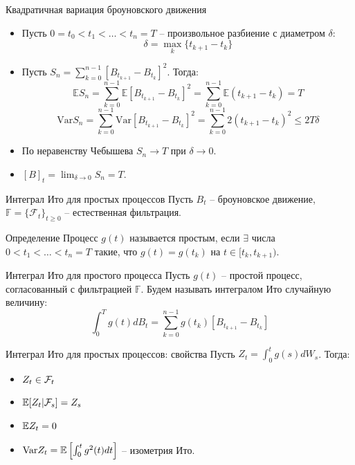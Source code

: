 \documentclass{beamer}
\begin{document}
\begin{frame}{Квадратичная вариация броуновского движения}
    \begin{itemize}
        \item Пусть $0 = t_0 < t_1 < \ldots < t_n = T$ -- произвольное разбиение с диаметром $\delta$: 
        $$\delta = \max_k \{t_{k+1} - t_k\}$$
        \item Пусть $S_n = \sum_{k=0}^{n-1} \left[B_{t_{k+1}} - B_{t_k}\right]^2$. Тогда:
        $$\mathbb{E} S_n = \sum_{k=0}^{n-1} \mathbb{E} \left[B_{t_{k+1}} - B_{t_k}\right]^2
        = \sum_{k=0}^{n-1} \mathbb{E} (t_{k+1}-t_k) = T$$
        $$\mathrm{Var} S_n = \sum_{k=0}^{n-1} \mathrm{Var} \left[B_{t_{k+1}} - B_{t_k}\right]^2
        = \sum_{k=0}^{n-1} 2 (t_{k+1}-t_k)^2 \leq 2 T \delta$$
        
        \item По неравенству Чебышева $S_n \to T$ при $\delta \to 0$.
        \item $[B]_t = \lim_{\delta\to 0} S_n = T$.
    \end{itemize}
\end{frame}

\begin{frame}{Интеграл Ито для простых процессов}
    Пусть $B_t$ -- броуновское движение, $\mathbb{F}=\{\mathcal{F} _t\}_{t\geq 0}$ -- естественная фильтрация.

    \begin{block}{Определение}
        Процесс $g(t)$ называется простым, если $\exists$ числа $0 < t_1 < \ldots < t_n = T$ такие, что $g(t) = g(t_k)$ на $t \in [t_k, t_{k+1})$.
    \end{block}
     
    
    \begin{block}{Интеграл Ито для простого процесса}
        Пусть $g(t)$ -- простой процесс, согласованный с фильтрацией $\mathbb{F}$. Будем называть интегралом Ито случайную величину:
        $$
            \int_0^T g(t) dB_t = \sum_{k=0}^{n-1} g(t_k)\left[B_{t_{k+1}} - B_{t_k}\right]
        $$
    \end{block}    
\end{frame}

\begin{frame}{Интеграл Ито для простых процессов: свойства}
    Пусть $Z_t = \int_0^t g(s) dW_s$. Тогда:
    \begin{itemize}
        \item $Z_t \in \mathcal{F}_t$
        \item $\mathbb{E} [Z_t | \mathcal{F}_s] = Z_s$
        \item $\mathbb{E} Z_t = 0$
        \item $\mathrm{Var} Z_t = \mathbb{E} \left[ \int_0^t g^2(t) dt \right] $ -- изометрия Ито.
    \end{itemize}
\end{frame}
\end{document}
